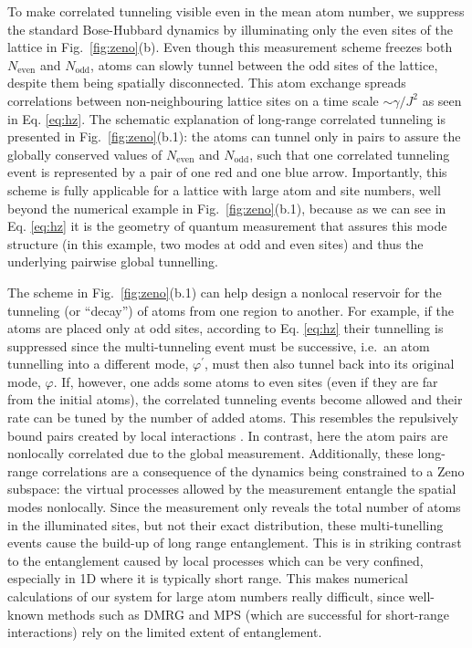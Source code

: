 To make correlated tunneling visible even in the mean atom number, we
suppress the standard Bose-Hubbard dynamics by illuminating only the
even sites of the lattice in Fig.~\ref{fig:zeno}(b). Even though this
measurement scheme freezes both $N_\text{even}$ and $N_\text{odd}$,
atoms can slowly tunnel between the odd sites of the lattice, despite
them being spatially disconnected. This atom exchange spreads
correlations between non-neighbouring lattice sites on a time scale
$\sim \gamma/J^2$ as seen in Eq. \eqref{eq:hz}. The schematic
explanation of long-range correlated tunneling is presented in
Fig.~\ref{fig:zeno}(b.1): the atoms can tunnel only in pairs to assure
the globally conserved values of $N_\text{even}$ and $N_\text{odd}$,
such that one correlated tunneling event is represented by a pair of
one red and one blue arrow. Importantly, this scheme is fully
applicable for a lattice with large atom and site numbers, well beyond
the numerical example in Fig.~\ref{fig:zeno}(b.1), because as we can
see in Eq. \eqref{eq:hz} it is the geometry of quantum measurement that
assures this mode structure (in this example, two modes at odd and
even sites) and thus the underlying pairwise global tunnelling.

The scheme in Fig.~\ref{fig:zeno}(b.1) can help design a nonlocal
reservoir for the tunneling (or ``decay'') of atoms from one region to
another. For example, if the atoms are placed only at odd sites,
according to Eq. \eqref{eq:hz} their tunnelling is suppressed since the
multi-tunneling event must be successive, i.e.~an atom tunnelling into
a different mode, $\varphi^\prime$, must then also tunnel back into
its original mode, $\varphi$. If, however, one adds some atoms to even
sites (even if they are far from the initial atoms), the correlated
tunneling events become allowed and their rate can be tuned by the
number of added atoms. This resembles the repulsively bound pairs
created by local interactions \cite{winkler2006, folling2007}. In
contrast, here the atom pairs are nonlocally correlated due to the
global measurement. Additionally, these long-range correlations are a
consequence of the dynamics being constrained to a Zeno subspace: the
virtual processes allowed by the measurement entangle the spatial
modes nonlocally. Since the measurement only reveals the total number
of atoms in the illuminated sites, but not their exact distribution,
these multi-tunelling events cause the build-up of long range
entanglement. This is in striking contrast to the entanglement caused
by local processes which can be very confined, especially in 1D where
it is typically short range. This makes numerical calculations of our
system for large atom numbers really difficult, since well-known
methods such as DMRG and MPS \cite{schollwock2005} (which are
successful for short-range interactions) rely on the limited extent of
entanglement.

